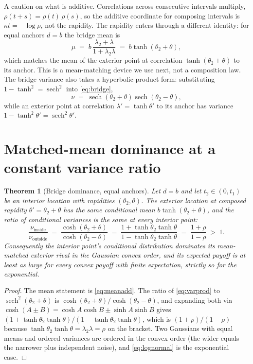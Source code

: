 \documentclass[11pt]{article}
\theoremstyle{itheads}
\newtheorem{theorem}{Theorem}
\newcommand{\sech}{\operatorname{sech}}
\begin{document}
A caution on what is additive. Correlations across consecutive
intervals multiply, $\rho(t+s)=\rho(t)\,\rho(s)$, so the additive
coordinate for composing intervals is $\kappa t=-\log\rho$, not the
rapidity. The rapidity enters through a different identity:
for equal anchors $d=b$ the bridge mean is
\begin{equation}\label{eq:meanadd}
\mu \;=\; b\,\frac{\lambda_2+\lambda}{1+\lambda_2\lambda}
\;=\; b\tanh\!\left(\theta_2+\theta\right),
\end{equation}
which matches the mean of the exterior point at correlation
$\tanh(\theta_2+\theta)$ to its anchor. This is a mean-matching device
we use next, not a composition law. The bridge variance also takes a
hyperbolic product form: substituting $1-\tanh^{2}=\sech^{2}$ into
\eqref{eq:bridge},
\begin{equation}\label{eq:varprod}
\nu \;=\; \sech\!\left(\theta_2+\theta\right)
\sech\!\left(\theta_2-\theta\right),
\end{equation}
while an exterior point at correlation $\lambda'=\tanh\theta'$ to its
anchor has variance $1-\tanh^{2}\theta'=\sech^{2}\theta'$.

\section{Matched-mean dominance at a constant variance ratio}

\begin{theorem}[Bridge dominance, equal anchors]\label{thm:dominance}
Let $d=b$ and let $t_2\in(0,t_1)$ be an interior location with
rapidities $(\theta_2,\theta)$. The exterior location at composed
rapidity $\theta'=\theta_2+\theta$ has the same conditional mean
$b\tanh(\theta_2+\theta)$, and the ratio of conditional variances is
the same at every interior point:
\begin{equation}\label{eq:constratio}
\frac{\nu_{\mathrm{inside}}}{\nu_{\mathrm{outside}}}
\;=\; \frac{\cosh(\theta_2+\theta)}{\cosh(\theta_2-\theta)}
\;=\; \frac{1+\tanh\theta_2\tanh\theta}{1-\tanh\theta_2\tanh\theta}
\;=\; \frac{1+\rho}{1-\rho} \;>\; 1 .
\end{equation}
Consequently the interior point's conditional distribution dominates
its mean-matched exterior rival in the Gaussian convex order, and its
expected payoff is at least as large for every convex payoff with
finite expectation, strictly so for the exponential.
\end{theorem}

\begin{proof}
The mean statement is \eqref{eq:meanadd}. The ratio of
\eqref{eq:varprod} to $\sech^{2}(\theta_2+\theta)$ is
$\cosh(\theta_2+\theta)/\cosh(\theta_2-\theta)$, and expanding both
via $\cosh(A\pm B)=\cosh A\cosh B\pm\sinh A\sinh B$ gives
$(1+\tanh\theta_2\tanh\theta)/(1-\tanh\theta_2\tanh\theta)$, which is
$(1+\rho)/(1-\rho)$ because $\tanh\theta_2\tanh\theta
=\lambda_2\lambda=\rho$ on the bracket. Two Gaussians with equal
means and ordered variances are ordered in the convex order (the
wider equals the narrower plus independent noise), and
\eqref{eq:lognormal} is the exponential case.
\end{proof}
\end{document}
